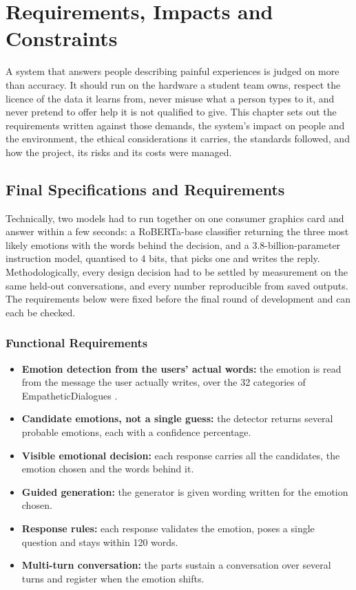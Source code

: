 \chapter{Requirements, Impacts and Constraints}
\label{ch:3}

A system that answers people describing painful experiences is judged on more than accuracy. It should run on the hardware a student team owns, respect the licence of the data it learns from, never misuse what a person types to it, and never pretend to offer help it is not qualified to give. This chapter sets out the requirements written against those demands, the system's impact on people and the environment, the ethical considerations it carries, the standards followed, and how the project, its risks and its costs were managed.

\section{Final Specifications and Requirements}
\label{sec:3.1}

Technically, two models had to run together on one consumer graphics card and answer within a few seconds: a RoBERTa-base classifier returning the three most likely emotions with the words behind the decision, and a 3.8-billion-parameter instruction model, quantised to 4 bits, that picks one and writes the reply. Methodologically, every design decision had to be settled by measurement on the same held-out conversations, and every number reproducible from saved outputs. The requirements below were fixed before the final round of development and can each be checked.

\subsection{Functional Requirements}

\begin{itemize}
  \item \textbf{Emotion detection from the users' actual words:} the emotion is read from the message the user actually writes, over the 32 categories of EmpatheticDialogues \cite{rashkin2019}.
  \item \textbf{Candidate emotions, not a single guess:} the detector returns several probable emotions, each with a confidence percentage.
  \item \textbf{Visible emotional decision:} each response carries all the candidates, the emotion chosen and the words behind it.
  \item \textbf{Guided generation:} the generator is given wording written for the emotion chosen.
  \item \textbf{Response rules: }each response validates the emotion, poses a single question and stays within 120 words.
  \item \textbf{Multi-turn conversation: }the parts sustain a conversation over several turns and register when the emotion shifts.
\end{itemize}
